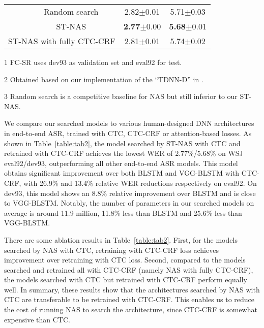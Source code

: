 \documentclass{article}
\newcommand{\tabref}{Table~\ref}
\begin{document}
\begin{table}[t]
{\begin{threeparttable}
\begin{tabular}{cccc}
                ~                                                            & Random search\tnote{3}                 & 2.82$\pm$0.01       & 5.71$\pm$0.03       \\
                ~                                                            & ST-NAS                                 & {\bf 2.77}$\pm$0.00 & {\bf 5.68}$\pm$0.01 \\
                \midrule
                \multicolumn{2}{c}{ST-NAS with fully CTC-CRF}                & 2.81$\pm$0.01                          & 5.74$\pm$0.02                             \\
                \bottomrule
            \end{tabular}
            \begin{tablenotes}
                \footnotesize
                \item[1] FC-SR uses dev93 as validation set and eval92 for test.
                \item[2] Obtained based on our implementation of the ``TDNN-D'' in \cite{peddinti2018low}.
                \item[3] Random search is a competitive baseline for NAS \cite{Li2019Random} but still inferior to our ST-NAS.
            \end{tablenotes}
        \end{threeparttable}}
\end{table}


We compare our searched models to various human-designed DNN architectures in end-to-end ASR, trained with CTC, CTC-CRF or attention-based losses.
As shown in \tabref{table:tab2}, the model searched by ST-NAS with CTC and retrained with CTC-CRF achieves the lowest WER of 2.77\%/5.68\% on WSJ eval92/dev93, outperforming all other end-to-end ASR models.
This model obtains significant improvement over both BLSTM and VGG-BLSTM with CTC-CRF, with 26.9\% and 13.4\% relative WER reductions respectively on eval92.
On dev93, this model shows an 8.8\% relative improvement over BLSTM and is close to VGG-BLSTM.
Notably, the number of parameters in our searched models on average is around 11.9 million, 11.8\% less than BLSTM and 25.6\% less than VGG-BLSTM.

There are some ablation results in \tabref{table:tab2}.
First, for the models searched by NAS with CTC, retraining with CTC-CRF loss achieves improvement over retraining with CTC loss.
Second, compared to the models searched and retrained all with CTC-CRF (namely NAS with fully CTC-CRF), the models searched with CTC but retrained with CTC-CRF perform equally well.
In summary, these results show that the architectures searched by NAS with CTC are transferable to be retrained with CTC-CRF.
This enables us to reduce the cost of running NAS to search the architecture, since CTC-CRF is somewhat expensive than CTC.
\end{document}
